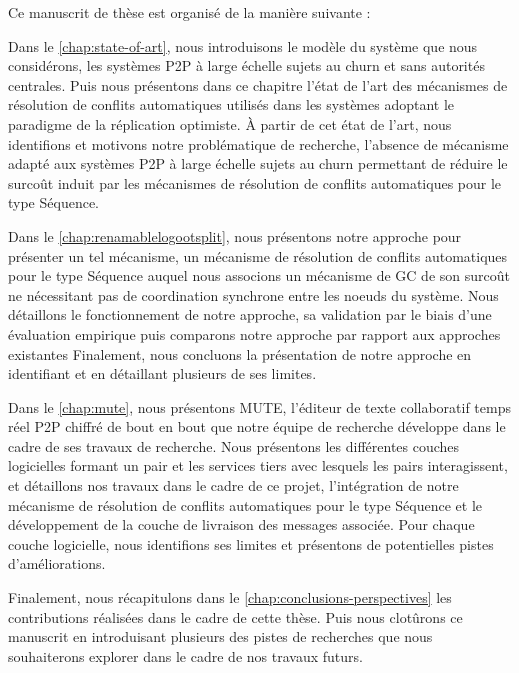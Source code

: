 
Ce manuscrit de thèse est organisé de la manière suivante :

Dans le \autoref{chap:state-of-art}, nous introduisons le modèle du système que nous considérons, \ie les systèmes \ac{P2P} à large échelle sujets au churn et sans autorités centrales.
Puis nous présentons dans ce chapitre l'état de l'art des mécanismes de résolution de conflits automatiques utilisés dans les systèmes adoptant le paradigme de la réplication optimiste.
À partir de cet état de l'art, nous identifions et motivons notre problématique de recherche, \ie l'absence de mécanisme adapté aux systèmes \ac{P2P} à large échelle sujets au churn permettant de réduire le surcoût induit par les mécanismes de résolution de conflits automatiques pour le type Séquence.

Dans le \autoref{chap:renamablelogootsplit}, nous présentons notre approche pour présenter un tel mécanisme, \ie un mécanisme de résolution de conflits automatiques pour le type Séquence auquel nous associons un mécanisme de \ac{GC} de son surcoût ne nécessitant pas de coordination synchrone entre les noeuds du système.
Nous détaillons le fonctionnement de notre approche, sa validation par le biais d'une évaluation empirique puis comparons notre approche par rapport aux approches existantes
Finalement, nous concluons la présentation de notre approche en identifiant et en détaillant plusieurs de ses limites.

Dans le \autoref{chap:mute}, nous présentons \ac{MUTE}, l'éditeur de texte collaboratif temps réel \ac{P2P} chiffré de bout en bout que notre équipe de recherche développe dans le cadre de ses travaux de recherche.
Nous présentons les différentes couches logicielles formant un pair et les services tiers avec lesquels les pairs interagissent, et détaillons nos travaux dans le cadre de ce projet, \ie l'intégration de notre mécanisme de résolution de conflits automatiques pour le type Séquence et le développement de la couche de livraison des messages associée.
Pour chaque couche logicielle, nous identifions ses limites et présentons de potentielles pistes d'améliorations.

Finalement, nous récapitulons dans le \autoref{chap:conclusions-perspectives} les contributions réalisées dans le cadre de cette thèse.
Puis nous clotûrons ce manuscrit en introduisant plusieurs des pistes de recherches que nous souhaiterons explorer dans le cadre de nos travaux futurs.

